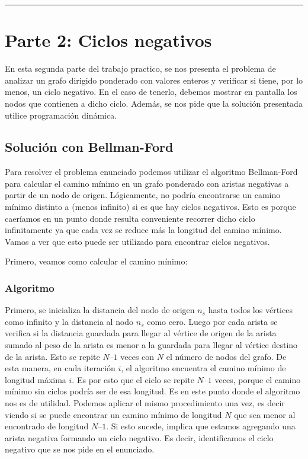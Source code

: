 \documentclass[titlepage,a4paper]{article}
\begin{document}
\noindent\rule{\textwidth}{0.5pt}

\newpage

\section{Parte 2: Ciclos negativos}
\label{sec:org0480ac1}

En esta segunda parte del trabajo practico, se nos presenta el problema de
analizar un grafo dirigido ponderado con valores enteros y verificar si tiene,
por lo menos, un ciclo negativo. En el caso de tenerlo, debemos mostrar en
pantalla los nodos que contienen a dicho ciclo. Además, se nos pide que la
solución presentada utilice programación dinámica.

\subsection{Solución con Bellman-Ford}
\label{sec:orgc197a7c}
Para resolver el problema enunciado podemos utilizar el algoritmo Bellman-Ford
para calcular el camino mínimo en un grafo ponderado con aristas negativas a
partir de un nodo de origen. Lógicamente, no podría encontrarse un camino mínimo
distinto a (menos infinito) si es que hay ciclos negativos. Esto es porque
caeríamos en un punto donde resulta conveniente recorrer dicho ciclo
infinitamente ya que cada vez se reduce más la longitud del camino mínimo. Vamos
a ver que esto puede ser utilizado para encontrar ciclos negativos.


\hfill

Primero, veamos como calcular el camino mínimo:

\subsubsection{Algoritmo}
\label{sec:orgbdf0a42}

Primero, se inicializa la distancia del nodo de origen \(n_s\) hasta todos los
vértices como infinito y la distancia al nodo \(n_s\) como cero. Luego por cada
arista se verifica si la distancia guardada para llegar al vértice de origen de
la arista sumado al peso de la arista es menor a la guardada para llegar al
vértice destino de la arista. Esto se repite \(N – 1\) veces con \(N\) el número de
nodos del grafo. De esta manera, en cada iteración \(i\), el algoritmo encuentra el
camino mínimo de longitud máxima \(i\). Es por esto que el ciclo se repite \(N – 1\)
veces, porque el camino mínimo sin ciclos podría ser de esa longitud. Es en este
punto donde el algoritmo nos es de utilidad. Podemos aplicar el mismo
procedimiento una vez, es decir viendo si se puede encontrar un camino mínimo de
longitud \(N\) que sea menor al encontrado de longitud \(N – 1\). Si esto sucede,
implica que estamos agregando una arista negativa formando un ciclo negativo. Es
decir, identificamos el ciclo negativo que se nos pide en el enunciado.
\end{document}
